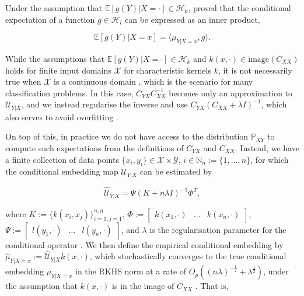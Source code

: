 \documentclass{article}
\begin{document}
	Under the assumption that $\mathbb{E}[g(Y) | X = \cdot] \in \mathcal{H}_{k}$, \cite{song2009hilbert} proved that the conditional expectation of a function $g \in \mathcal{H}_{l}$ can be expressed as an inner product,  %
	
	\begin{equation}
		\mathbb{E}[g(Y) | X = x] = \langle \mu_{Y | X = x}, g \rangle.
	\label{eq:conditional_expectation}
	\end{equation}
	
	While the assumptions that $\mathbb{E}[g(Y) | X = \cdot] \in \mathcal{H}_{k}$ and $k(x, \cdot) \in \mathrm{image}(C_{XX})$ holds for finite input domains $\mathcal{X}$ for characteristic kernels $k$, it is not necessarily true when $\mathcal{X}$ is a continuous domain \citep{fukumizu2004dimensionality}, which is the scenario for many classification problems. In this case, $C_{YX} C_{XX}^{-1}$ becomes only an approximation to $\mathcal{U}_{Y | X}$, and we instead regularise the inverse and use $C_{YX} (C_{XX} + \lambda I)^{-1}$, which also serves to avoid overfitting \citep[p. 13]{song2013kernel}.
	
	On top of this, in practice we do not have access to the distribution $\mathbb{P}_{X Y}$ to compute such expectations from the definitions of $C_{YX}$ and $C_{XX}$. Instead, we have a finite collection of data points $\{x_{i}, y_{i}\} \in \mathcal{X} \times \mathcal{Y}$, $i \in \mathbb{N}_{n} := \{1, \dots, n\}$, for which the conditional embedding map $\mathcal{U}_{Y | X}$ can be estimated by
	
	\begin{equation}
		\hat{\mathcal{U}}_{Y | X} = \Psi (K + n \lambda I)^{-1} \Phi^{T},
	\label{eq:empirical_conditional_embedding}
	\end{equation}
	
	where $K := \{k(x_{i}, x_{j})\}_{i = 1, j = 1}^{n, n}$, $\Phi := \begin{bmatrix} k(x_{1}, \cdot) & \dots & k(x_{n}, \cdot) \end{bmatrix}$, $\Psi := \begin{bmatrix} l(y_{1}, \cdot) & \dots & l(y_{n}, \cdot) \end{bmatrix}$, and $\lambda$ is the regularisation parameter for the conditional operator \citep{song2013kernel}. We then define the empirical conditional embedding by $\hat{\mu}_{Y | X = x} := \hat{\mathcal{U}}_{Y | X} k(x, \cdot)$, which stochastically converges to the true conditional embedding $\mu_{Y | X = x}$ in the RKHS norm at a rate of $O_{p}((n \lambda)^{-\frac{1}{2}} + \lambda^{\frac{1}{2}})$, under the assumption that $k(x, \cdot)$ is in the image of $C_{XX}$ \citep{song2009hilbert}. That is, %
	
\end{document}
